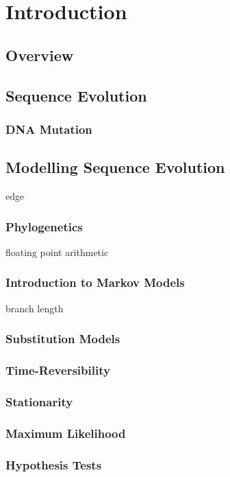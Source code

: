 \chapter{Introduction}

\section{Overview}

\section{Sequence Evolution}

\subsection{DNA Mutation}

\section{Modelling Sequence Evolution}
\gls{edge}
\subsection{Phylogenetics}
\gls{floating point arithmetic}
\subsection{Introduction to Markov Models}
\gls{branch length}
\subsection{Substitution Models}

\subsection{Time-Reversibility}

\subsection{Stationarity}

\subsection{Maximum Likelihood}

\subsection{Hypothesis Tests}

